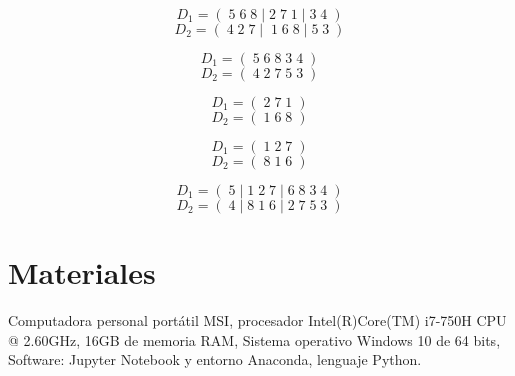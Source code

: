 \documentclass[10pt,letterpaper]{article}
\begin{document}
\[D_1 = ( \;5\;6\;8\; |\; 2\;7\;1\; | \;3\;4\; )\]
\[D_2 = ( \;4\;2\;7 \;|\; \;1\;6\;8\; |\; 5\;3\; )\]

\[D_1 = ( \;5\;6\;8\;3\;4\; )\]
\[D_2 = ( \;4\;2\;7\;5\;3\; )\]

\[D_1 = (\;2\;7\;1\;)\]
\[D_2 = (\;1\;6\;8\;)\]

\[D_1 = (\;1\;2\;7\;)\]
\[D_2 = (\;8\;1\;6\;)\]

\[D_1 = ( \;5\;|\;1\;2\;7\;|\;6\;8\;3\;4\; )\]
\[D_2 = ( \;4\;|\;8\;1\;6\;|\;2\;7\;5\;3\; )\]

\section{Materiales}
Computadora personal portátil MSI, procesador Intel(R)Core(TM) i7-750H CPU @ 2.60GHz, 16GB de memoria RAM, Sistema operativo Windows 10 de 64 bits, Software: Jupyter Notebook y entorno Anaconda, lenguaje Python.
\end{document}
